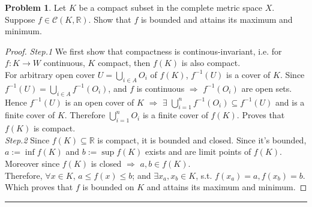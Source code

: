\documentclass[a4paper, 10pt]{article}
\theoremstyle{definition}
\newtheorem{problem}{Problem}
\theoremstyle{hSol}
\begin{document}
\begin{problem} Let $K$ be a compact subset in the complete metric space $X$. Suppose $f\in \mathcal{C}(K, \mathbb{R})$. Show that $f$ is bounded and attains its maximum and minimum.
\end{problem}
\begin{proof} \textit{Step.1} We first show that compactness is continous-invariant, i.e. for $f: K\to W$ continuous, $K$ compact, then $f(K)$ is also compact. \\
For arbitrary open cover $U=\bigcup_{i\in A} O_i$ of $f(K)$, $f^{-1}(U)$ is a cover of $K$. Since $f^{-1}(U)=\bigcup_{i\in A} f^{-1}(O_i)$, and $f$ is continuous $\Rightarrow$ $f^{-1}(O_i)$ are open sets. Hence $f^{-1}(U)$ is an open cover of $K$ $\Rightarrow$ $\exists$ $\bigcup_{i=1}^{n} f^{-1}(O_i) \subseteq f^{-1}(U)$ and is a finite cover of $K$. Therefore $\bigcup_{i=1}^{n} O_i$ is a finite cover of $f(K)$. Proves that $f(K)$ is compact.\\
\textit{Step.2} Since $f(K) \subseteq \mathbb{R}$ is compact, it is bounded and closed. Since it's bounded, $a:=\inf f(K)$ and $b:=\sup f(K)$ exists and are limit points of $f(K)$. Moreover since $f(K)$ is closed $\Rightarrow$ $a,b \in f(K)$.\\
Therefore, $\forall x \in K$, $a\leq f(x)\leq b$; and $\exists x_a, x_b \in K$, s.t. $f(x_a)=a, f(x_b)=b$. Which proves that $f$ is bounded on $K$ and attains its maximum and minimum.
\end{proof}

\noindent\rule{16cm}{0.4pt}
\end{document}
